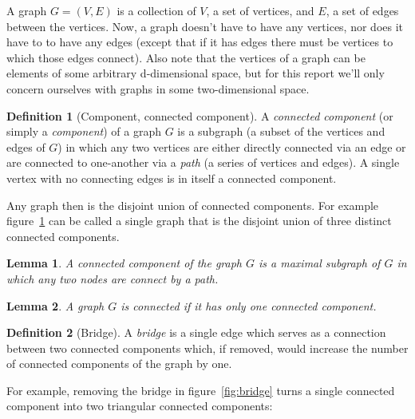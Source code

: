 \documentclass{amsart}
\theoremstyle{plain}
\newtheorem*{lemma}{Lemma}
\theoremstyle{remark}
\theoremstyle{definition}
\newtheorem*{definition}{Definition}
\begin{document}
A graph $G=(V,E)$ is a collection of $V$, a set of vertices, and $E$, a set of
edges between the vertices. Now, a graph doesn't have to have any vertices, nor
does it have to to have any edges (except that if it has edges there must be
vertices to which those edges connect).
Also note that the vertices of a graph can be elements of some arbitrary
d-dimensional space, but for this report we'll only concern ourselves with
graphs in some two-dimensional space.
\begin{definition}[Component, connected component]
  A \emph{connected component} (or simply a \emph{component}) of a graph $G$ is
  a subgraph (a subset of the vertices and edges of $G$) in which any two
  vertices are either directly connected via an edge or are connected to
  one-another via a \emph{path} (a series of vertices and edges). A single
  vertex with no connecting edges is in itself a connected component.
\end{definition}
Any graph then is the disjoint union of connected components.
For example figure~\ref{fig:disjoint-union} can be called a single graph that is the disjoint
union of three distinct connected components.
\begin{figure}[h]
  \caption[Disjoin union]{}
  \label{fig:disjoint-union}
\end{figure}
\begin{lemma}
  A connected component of the graph $G$ is a maximal subgraph of $G$ in which
  any two nodes are connect by a path.
\end{lemma}
\begin{lemma}
  A graph $G$ is \emph{connected} if it has only one connected component.
\end{lemma}
\begin{definition}[Bridge]
  A \emph{bridge} is a single edge which serves as a connection between two connected
  components which, if removed, would increase the number of connected
  components of the graph by one.
\end{definition}
For example, removing the bridge in figure~\ref{fig:bridge} turns a single
connected component into two triangular connected components:
\end{document}
